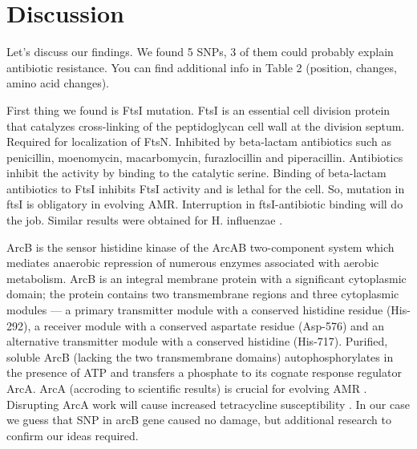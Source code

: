 \documentclass{article}
\begin{document}
\section{Discussion}
%
%
%
%

Let's discuss our findings.
We found 5 SNPs, 3 of them could probably explain antibiotic resistance. You can find additional info in Table 2 (position, changes, amino acid changes).

First thing we found is FtsI mutation.
FtsI is an essential cell division protein that catalyzes cross-linking of the peptidoglycan cell wall at the division septum. Required for localization of FtsN.
Inhibited by beta-lactam antibiotics such as penicillin, moenomycin, macarbomycin, furazlocillin and piperacillin. Antibiotics inhibit the activity by binding to the catalytic serine. Binding of beta-lactam antibiotics to FtsI inhibits FtsI activity and is lethal for the cell. So, mutation in ftsI is obligatory in evolving AMR. Interruption in ftsI-antibiotic binding will do the job. Similar results were obtained for H. influenzae \cite{bwamsnotes}.

ArcB is the sensor histidine kinase of the ArcAB two-component system which mediates anaerobic repression of numerous enzymes associated with aerobic metabolism. ArcB is an integral membrane protein with a significant cytoplasmic domain; the protein contains two transmembrane regions and three cytoplasmic modules — a primary transmitter module with a conserved histidine residue (His-292), a receiver module with a conserved aspartate residue (Asp-576) and an alternative transmitter module with a conserved histidine (His-717). Purified, soluble ArcB (lacking the two transmembrane domains) autophosphorylates in the presence of ATP and transfers a phosphate to its cognate response regulator ArcA. ArcA (accroding to scientific results) is crucial for evolving AMR \cite{amr}. Disrupting ArcA work will cause increased tetracycline susceptibility \cite{sucs}. In our case we guess that SNP in arcB gene caused no damage, but additional research to confirm our ideas required.
\end{document}
